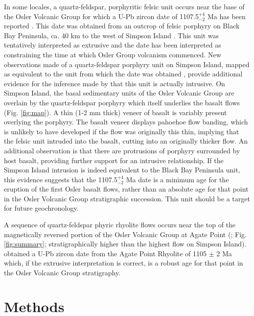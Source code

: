 \documentclass[draft,gc]{AGUTeX}
\begin{document}
\begin{article}
In some locales, a quartz-feldspar, porphyritic felsic unit occurs near the base of the Osler Volcanic Group for which a U-Pb zircon date of 1107.5$^{+4}_{-2}$ Ma has been reported \citep{Davis1985a}.  This date was obtained from an outcrop of felsic porphyry on Black Bay Peninsula, ca. 40 km to the west of Simpson Island \citep{Davis1985a}.  This unit was tentatively interpreted as extrusive \citep{Davis1985a, Lightfoot1991a} and the date has been interpreted as constraining the time at which Osler Group volcanism commenced.  New observations made of a quartz-feldspar porphyry unit on Simpson Island, mapped as equivalent to the unit from which the date was obtained \citep{Giguere1975a}, provide additional evidence for the inference made by \citet{Giguere1975a} that this unit is actually intrusive.  On Simpson Island, the basal sedimentary units of the Osler Volcanic Group are overlain by the quartz-feldspar porphyry which itself underlies the basalt flows (Fig. \ref{fig:map}). A thin (1-2 mm thick) veneer of basalt is variably present overlying the porphyry.  The basalt veneer displays pahoehoe flow banding, which is unlikely to have developed if the flow was originally this thin, implying that the felsic unit intruded into the basalt, cutting into an originally thicker flow.  An additional observation is that there are protrusions of porphyry surrounded by host basalt, providing further support for an intrusive relationship. If the Simpson Island intrusion is indeed equivalent to the Black Bay Peninsula unit, this evidence suggests that the  1107.5$^{+4}_{-2}$ Ma  date is a minimum age for the eruption of the first Osler basalt flows, rather than an absolute age for that point in the Osler Volcanic Group stratigraphic succession. This unit should be a target for future geochronology.

A sequence of quartz-feldspar phyric rhyolite flows occurs near the top of the magnetically reversed portion of the Osler Volcanic Group at Agate Point (\cite{Davis1985a}; Fig. \ref{fig:summary}; stratigraphically higher than the highest flow on Simpson Island). \cite{Davis1997a} obtained a U-Pb zircon date from the Agate Point Rhyolite of 1105 $\pm$ 2 Ma which, if the extrusive interpretation is correct, is a robust age for that point in the Osler Volcanic Group stratigraphy.

\section{Methods}


\end{article}
\end{document}
